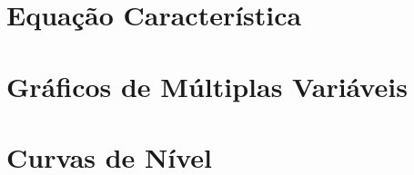 \documentclass{article}
\begin{document}
    \section{Equação Característica} \label{sec:caract}

    \section{Gráficos de Múltiplas Variáveis} \label{sec:multiv}

    \section{Curvas de Nível} \label{sec:contorno}
\end{document}
